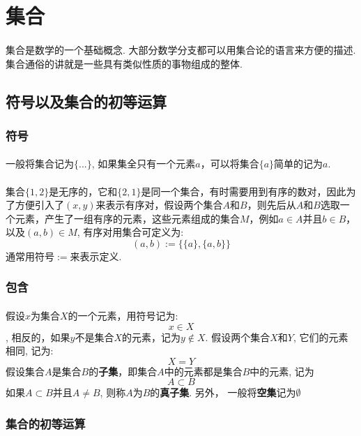 \section{集合}

\paragraph{}
集合是数学的一个基础概念. 大部分数学分支都可以用集合论的语言来方便的描述. 集合通俗的讲就是一些具有类似性质的事物组成的整体. 

\subsection{符号以及集合的初等运算}

\subsubsection{符号}
\paragraph{}
一般将集合记为$\{...\}$, 如果集全只有一个元素$a$，可以将集合$\{a\}$简单的记为$a$.
\paragraph{}
集合$\{1, 2\}$是无序的，它和$\{2, 1\}$是同一个集合，有时需要用到有序的数对，因此为了方便引入了$(x, y)$来表示有序对，假设两个集合$A$和$B$，则先后从$A$和$B$选取一个元素，产生了一组有序的元素，这些元素组成的集合$M$，例如$a \in A$并且$b \in B$，以及$(a, b) \in M$, 有序对用集合可定义为:
$$
(a, b) := \{\{a\},\{a, b\}\}
$$
通常用符号$:=$来表示定义.

\subsubsection{包含}
\paragraph{}
假设$x$为集合$X$的一个元素，用符号记为:
$$
x \in X
$$, 相反的，如果$y$不是集合$X$的元素，记为$y \notin X$.
假设两个集合$X$和$Y$, 它们的元素相同, 记为:
$$
X = Y
$$
假设集合$A$是集合$B$的\textbf{子集}，即集合$A$中的元素都是集合$B$中的元素, 记为
$$
A \subset B
$$
如果$A \subset B$并且$A \neq B$, 则称$A$为$B$的\textbf{真子集}. 另外， 一般将\textbf{空集}记为$\emptyset$

\subsubsection{集合的初等运算}
